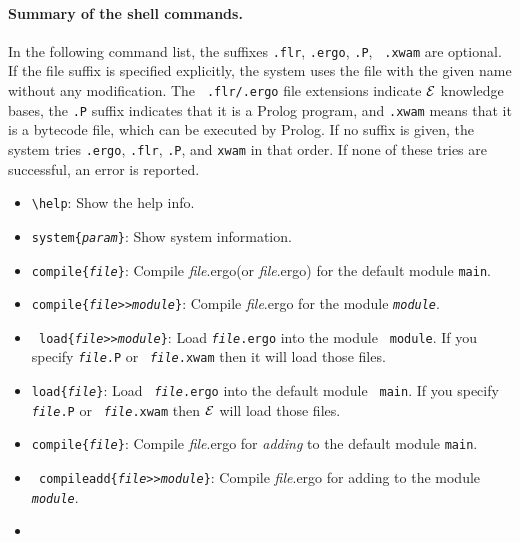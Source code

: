 \documentclass[11pt]{article}
\newcommand{\ERGO}{\mbox{\ensuremath{\cal{E}}\smaller{{\sc{RGO}}}}\xspace}
\newcommand{\FLSYSTEM}{\ERGO}
\newcommand{\flrext}{flr\xspace}
\newcommand{\ergoext}{ergo\xspace}
\newcommand{\bs}{\textbackslash}
\newcommand{\ofile}{xwam}
\begin{document}
\paragraph{Summary of the shell commands.}
In the following command list, the suffixes {\tt .\flrext}, \texttt{.\ergoext},
{\tt .P}, {\tt
  .\ofile} are optional. If the file suffix is specified explicitly, the
system uses the file with the given name without any modification. The {\tt
  .\flrext/.\ergoext} file extensions indicate \FLSYSTEM knowledge bases, the {\tt .P} suffix indicates that
it is a Prolog program, and {\tt .\ofile} means that it is a bytecode file,
which can be executed by Prolog.  If no suffix is given, the system tries
\texttt{.\ergoext}, \texttt{.\flrext}, \texttt{.P}, and
\texttt{\ofile} in that order.
If none of these tries are successful, an error is reported.
%
\begin{itemize}
\item {\tt \bs{}help}:
  Show the help info.
\item \texttt{system\{\textnormal\emph{param}\}}:
  Show system information.
\item {\tt compile\{\textnormal{\emph{file}}\}}:
  Compile \textnormal{\emph{file}}.\ergoext (or
  \textnormal{\emph{file}}.\ergoext) for the default module {\tt main}.
\item {\tt compile\{\textnormal{\emph{file}}>{}>\textnormal{\emph{module}}\}}:
  Compile \textnormal{\emph{file}}.\ergoext for the module {\tt \textnormal{\emph{module}}}.
\item {\tt
    load\{\textnormal{\emph{file}}>{}>\textnormal{\emph{module}}\}}: Load
  {\tt \textnormal{\emph{file}}.\ergoext} into the module {\tt
    module}. If you specify {\tt \textnormal{\emph{file}}.P} or {\tt
    \textnormal{\emph{file}}.\ofile} then it will load
  those files.
\item {\tt load\{\textnormal{\emph{file}}\}}: Load {\tt
    \textnormal{\emph{file}}.\ergoext} into the default module {\tt
    main}. If you specify {\tt \textnormal{\emph{file}}.P} or {\tt
    \textnormal{\emph{file}}.\ofile} then \FLSYSTEM will load
  those files.
\item {\tt compile\{\textnormal{\emph{file}}\}}:
  Compile \textnormal{\emph{file}}.\ergoext for \emph{adding} to the default module {\tt main}.
\item {\tt
    compileadd\{\textnormal{\emph{file}}>{}>\textnormal{\emph{module}}\}}:
  Compile \textnormal{\emph{file}}.\ergoext for adding to the module {\tt
    \textnormal{\emph{module}}}.
\item {\tt
}
\end{itemize}
\end{document}
